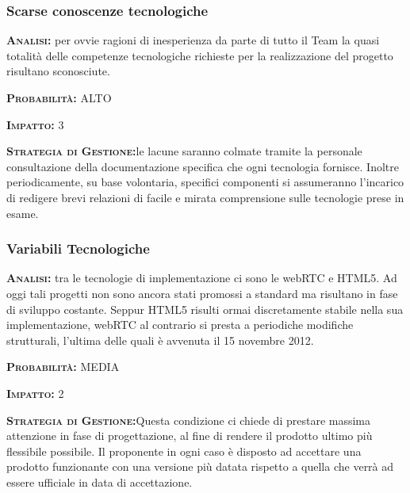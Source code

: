 \subsubsection{Scarse conoscenze tecnologiche}
\begin{description}
	\item{\scshape\bfseries Analisi:} per ovvie ragioni di inesperienza da parte di tutto il Team la quasi totalità delle competenze tecnologiche richieste per la realizzazione del progetto risultano sconosciute.
	\item{\scshape\bfseries Probabilità:} ALTO
	\item{\scshape\bfseries Impatto:} 3
	\item{\scshape\bfseries Strategia di Gestione:}le lacune saranno colmate tramite la personale consultazione della documentazione specifica che ogni tecnologia fornisce. Inoltre periodicamente, su base volontaria, specifici componenti si assumeranno l'incarico di redigere brevi relazioni di facile e mirata comprensione sulle tecnologie prese in esame.
\end{description}

\subsubsection{Variabili Tecnologiche}
\begin{description}
	\item{\scshape\bfseries Analisi:} tra le tecnologie di implementazione ci sono le webRTC e HTML5. Ad oggi tali progetti non sono ancora stati promossi a standard ma risultano in fase di sviluppo costante. Seppur HTML5 risulti ormai discretamente stabile nella sua implementazione, webRTC al contrario si presta a periodiche modifiche strutturali, l'ultima delle quali è avvenuta il 15 novembre 2012.
	\item{\scshape\bfseries Probabilità:} MEDIA
	\item{\scshape\bfseries Impatto:} 2
	\item{\scshape\bfseries Strategia di Gestione:}Questa condizione ci chiede di prestare massima attenzione in fase di progettazione, al fine di rendere il prodotto ultimo più flessibile possibile. Il proponente in ogni caso è disposto ad accettare una prodotto funzionante con una versione più datata rispetto a quella che verrà ad essere ufficiale in data di accettazione.
\end{description}

